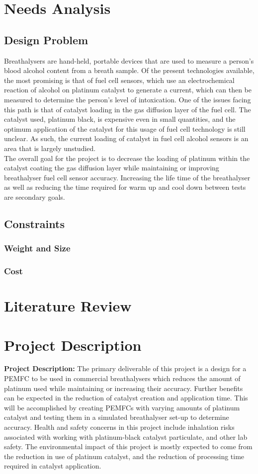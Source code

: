 \documentclass{article}
\begin{document}
	\section{Needs Analysis}
		\subsection{Design Problem}
	Breathalysers are hand-held, portable devices that are used to measure a person's blood alcohol content from a breath sample. Of the present technologies available, the most promising is that of fuel cell sensors, which use an electrochemical reaction of alcohol on platinum catalyst to generate a current, which can then be measured to determine the person's level of intoxication. One of the issues facing this path is that of catalyst loading in the gas diffusion layer of the fuel cell. The catalyst used, platinum black, is expensive even in small quantities, and the optimum application of the catalyst for this usage of fuel cell technology is still unclear. As such, the current loading of catalyst in fuel cell alcohol sensors is an area that is largely unstudied.\\
	The overall goal for the project is to decrease the loading of platinum within the catalyst coating the gas diffusion layer while maintaining or improving breathalyser fuel cell sensor accuracy. Increasing the life time of the breathalyser as well as reducing the time required for warm up and cool down between tests are secondary goals.
		\subsection{Constraints}
			\subsubsection{Weight and Size}
			\subsubsection{Cost}
	\section{Literature Review}
	\section{Project Description}
		\textbf{Project Description:}
		The primary deliverable of this project is a design for a PEMFC to be used in commercial breathalysers which reduces the amount of platinum used while maintaining or increasing their accuracy. Further benefits can be expected in the reduction of catalyst creation and application time. This will be accomplished by creating PEMFCs with varying amounts of platinum catalyst and testing them in a simulated breathalyser set-up to determine accuracy. Health and safety concerns in this project include inhalation risks associated with working with platinum-black catalyst particulate, and other lab safety. The environmental impact of this project is mostly expected to come from the reduction in use of platinum catalyst, and the reduction of processing time required in catalyst application.
\end{document}

